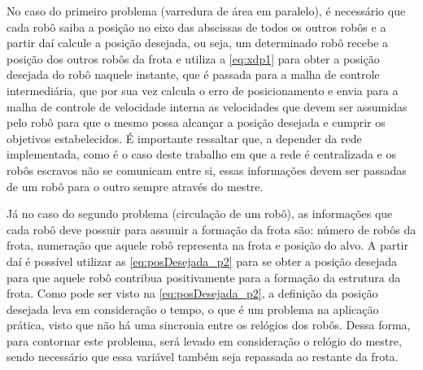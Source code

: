 No caso do primeiro problema (varredura de área em paralelo), é necessário que cada robô saiba a posição no eixo das abscissas de todos os outros robôs e a partir daí calcule a posição desejada, ou seja, um determinado robô recebe a posição dos outros robôs da frota e utiliza a \autoref{eq:xdp1} para obter a posição desejada do robô naquele instante, que é passada para a malha de controle intermediária, que por sua vez calcula o erro de posicionamento e envia para a malha de controle de velocidade interna as velocidades que devem ser assumidas pelo robô para que o mesmo possa alcançar a posição desejada e cumprir os objetivos estabelecidos. É importante ressaltar que, a depender da rede implementada, como é o caso deste trabalho em que a rede é centralizada e os robôs escravos não se comunicam entre si, essas informações devem ser passadas de um robô para o outro sempre através do mestre. %

Já no caso do segundo problema (circulação de um robô), as informações que cada robô deve possuir para assumir a formação da frota são: número de robôs da frota, numeração que aquele robô representa na frota e posição do alvo. A partir daí é possível utilizar as \autoref{eq:posDesejada_p2} para se obter a posição desejada para que aquele robô contribua positivamente para a formação da estrutura da frota. Como pode ser visto na \autoref{eq:posDesejada_p2}, a definição da posição desejada leva em consideração o tempo, o que é um problema na aplicação prática, visto que não há uma sincronia entre os relógios dos robôs. Dessa forma, para contornar este problema, será levado em consideração o relógio do mestre, sendo necessário que essa variável também seja repassada ao restante da frota. 











 

